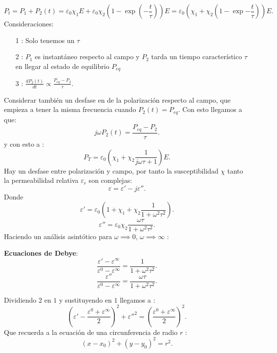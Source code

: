 \begin{tcolorbox}[enhanced,attach boxed title to top center={yshift=-3mm,yshifttext=-1mm},
colback=blue!5!white,colframe=blue!75!black,colbacktitle=blue!80!black,
title=Polarización Total,fonttitle=\bfseries,
 boxed title style={size=small,colframe=blue!50!black} ]
 \[
     P_t=P_1+P_2\left( t \right) = \varepsilon_0 \chi_1 E + \varepsilon_0 \chi_2 \left( 1-\exp(-\frac{t}{\tau}) \right) E= \varepsilon_0 \left( \chi_1 + \chi_2 \left( 1- \exp{-\frac{t}{\tau}} \right)  \right) E
 .\] 
 Consideraciones:
 \begin{itemize}
     \item[1]: Solo tenemos un $\tau$ 
     \item[2]: $ P_1$ es instantáneo respecto al campo y $P_2$ tarda un tiempo característico $\tau$ en llegar al estado de equilibrio $P_{eq}$
     \item[3]: $
         \frac{d P_2\left( t \right)}{d t} \propto \frac{P_{eq}- P_2}{\tau}
     .$
 \end{itemize}
 Considerar también un desfase en de la polarización respecto al campo, que empieza a tener la misma frecuencia cuando $P_2\left( t \right) = P_{eq}$. Con esto llegamos a que:
 \[
     j\omega P_2\left( t \right) = \frac{P_{eq}- P_2}{\tau} 
 .\] 
 y con esto a :
 \[
     P_T= \varepsilon_0\left( \chi_1 + \chi_2 \frac{1}{j\omega \tau +1} \right) E
 .\] 
Hay un desfase entre polarización y campo, por tanto la susceptibilidad $\chi$ tanto la permeabilidad relativa $\varepsilon_r$ son complejas:
 \[
\varepsilon= \varepsilon ' - j\varepsilon ''
.\] 
Donde  \[
    \varepsilon '= \varepsilon_0\left( 1+\chi_1 + \chi_2 \frac{1}{1+ \omega^2 \tau^2} \right) 
.\] 
\[
    \varepsilon ''= \varepsilon_0\chi_2 \frac{\omega \tau}{1+\omega^2 \tau^2}
.\] 
Haciendo un análisis asintótico para $\omega \implies 0$, $\omega\implies \infty$ :
\begin{center}
    \textbf{Ecuaciones  de Debye}:
    \[
        \frac{\varepsilon ' - \varepsilon ^{\infty}}{\varepsilon^0- \varepsilon^{\infty}}= \frac{1}{1+ \omega^2 \tau^2}
.\] 
\[
    \frac{\varepsilon ''}{\varepsilon^0- \varepsilon^{\infty}}=\frac{\omega\tau}{1+ \omega^2 \tau^2}
.\] 
\end{center}
Dividiendo $2$ en $1$ y sustituyendo en $1$ llegamos a :
\[
    \left( \varepsilon' - \frac{\varepsilon^0+\varepsilon^{\infty}}{2} \right) ^2+ \varepsilon''^2=\left( \frac{\varepsilon^0+ \varepsilon^{\infty}}{2} \right)^2
.\] 
Que recuerda a la ecuación de una circunferencia de radio $r$ :
\[
    \left( x-x_0 \right) ^2+ \left( y-y_0 \right)^2=r^2 
.\]
\end{tcolorbox}
